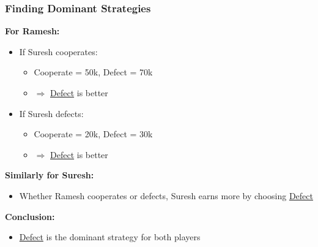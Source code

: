 \begin{frame}[fragile]\frametitle{Finding Dominant Strategies}

\textbf{For Ramesh:}

\begin{itemize}
  \item If Suresh cooperates:
  \begin{itemize}
    \item Cooperate = 50k, Defect = 70k
    \item $\Rightarrow$ \underline{Defect} is better
  \end{itemize}
  
  \item If Suresh defects:
  \begin{itemize}
    \item Cooperate = 20k, Defect = 30k
    \item $\Rightarrow$ \underline{Defect} is better
  \end{itemize}
\end{itemize}

\vspace{6pt}

\textbf{Similarly for Suresh:}

\begin{itemize}
  \item Whether Ramesh cooperates or defects, Suresh earns more by choosing \underline{Defect}
\end{itemize}

\vspace{8pt}

\textbf{Conclusion:}
\begin{itemize}
  \item \underline{Defect} is the dominant strategy for both players
\end{itemize}

\end{frame}

